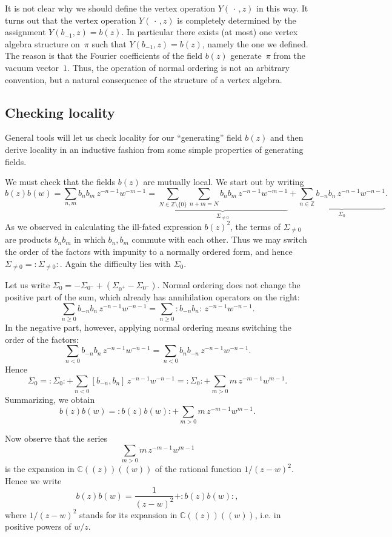 \documentclass[12pt]{article}
\begin{document}
It is not clear why we should define the vertex operation $Y(\,\cdot\,,z)$ in this way.
It turns out that the vertex operation $Y(\,\cdot\,,z)$
is completely determined by the assignment $Y(b_{-1},z)=b(z)$. In particular there exists (at most) one vertex algebra structure on~$\pi$
such that $Y(b_{-1},z)=b(z)$, namely the one we defined.
The reason is that the Fourier coefficients of the field $b(z)$ generate~$\pi$
from the vacuum vector~$1$.
Thus, the operation of normal ordering is not an arbitrary convention, but a natural consequence of the structure of a vertex algebra.

\subsection{Checking locality}
General tools will let us check locality for our “generating” field $b(z)$ and then derive locality in an inductive fashion from some simple properties of generating fields.

We must check that the fields $b(z)$ are mutually local. We start out by writing
\[
    b(z)b(w)
    = \sum_{n,m} b_n b_m\, z^{-n-1} w^{-m-1}
    = \underbrace{\sum_{N\in\mathbb{Z}\setminus\{0\}} \sum_{n+m=N} b_n b_m\,z^{-n-1}w^{-m-1}}_{\Sigma_{\neq 0}}
    + \underbrace{\sum_{n\in\mathbb{Z}} b_{-n}b_n\,z^{-n-1}w^{-n-1}}_{\Sigma_0}.
\]
As we observed in calculating the ill-fated expression \(b(z)^2\),
the terms of \(\Sigma_{\neq 0}\) are products \(b_n b_m\) in which \(b_n,b_m\) commute with each other.
Thus we may switch the order of the factors with impunity to a normally ordered form,
and hence \(\Sigma_{\neq 0} = :\Sigma_{\neq 0}:\).
Again the difficulty lies with \(\Sigma_0\).

Let us write \(\Sigma_0 = -\Sigma_{0^-} + (\Sigma_{0^+} - \Sigma_{0^-})\).
Normal ordering does not change the positive part of the sum,
which already has annihilation operators on the right:
\[
    \sum_{n\ge 0} b_{-n}b_n\,z^{-n-1}w^{-n-1}
    = \sum_{n\ge 0} :b_{-n}b_n:\,z^{-n-1}w^{-n-1}.
\]
In the negative part, however, applying normal ordering means switching the order of the factors:
\[
    \sum_{n<0} b_{-n}b_n\,z^{-n-1}w^{-n-1}
    = \sum_{n<0} b_n b_{-n}\,z^{-n-1}w^{-n-1}.
\]
Hence
\[
    \Sigma_0
    = :\Sigma_0: + \sum_{n<0} [b_{-n},b_n]\,z^{-n-1}w^{-n-1}
    = :\Sigma_0: + \sum_{m>0} m\,z^{-m-1}w^{m-1}.
\]
Summarizing, we obtain
\[
    b(z)b(w)
    = :b(z)b(w): + \sum_{m>0} m\,z^{-m-1}w^{m-1}.
\]

Now observe that the series
\begin{equation}\label{2.3.1}
    \sum_{m>0} m\,z^{-m-1}w^{m-1}
\end{equation}
is the expansion in \(\mathbb{C}((z))((w))\) of the rational function \(1/(z-w)^2\).
Hence we write
\begin{equation}\label{2.3.2}
    b(z)b(w)
    = \frac{1}{(z-w)^2} + :b(z)b(w):,
\end{equation}
where \(1/(z-w)^2\) stands for its expansion in \(\mathbb{C}((z))((w))\),
i.e. in positive powers of \(w/z\).
\end{document}

